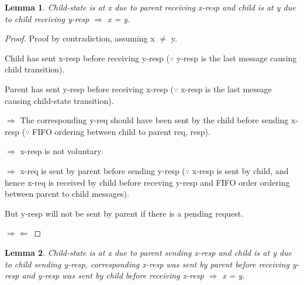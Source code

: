 \documentclass{article}
\newtheorem{lemma}{Lemma}
\begin{document}
\begin{lemma}
Child-state is at x due to parent receiving x-resp and child is at y due to child receiving y-resp $\Rightarrow$ x = y.
\label{CRecvPRecvNetwork}
\end{lemma}

\begin{proof}
Proof by contradiction, assuming x $\neq$ y.

\begin{figure}
\centering
\end{figure}

Child has sent x-resp before receiving y-resp ($\because$ y-resp is the last message causing child transition).

Parent has sent y-resp before receiving x-resp ($\because$ x-resp is the last message causing child-state transition).

$\Rightarrow$ The corresponding y-req should have been sent by the child before sending x-resp ($\because$ FIFO ordering between child to parent req, resp).

$\Rightarrow$ x-resp is not voluntary.

$\Rightarrow$ x-req is sent by parent before sending y-resp ($\because$ x-resp is sent by child, and hence x-req is received by child before receving y-resp and FIFO order ordering between parent to child messages).

But y-resp will not be sent by parent if there is a pending request.

\begin{figure}
\centering
\end{figure}

$\Rightarrow \Leftarrow$
\end{proof}

\begin{lemma}
Child-state is at x due to parent sending x-resp and child is at y due to child sending y-resp, corresponding x-resp was sent by parent before receiving y-resp and y-resp was sent by child before receiving x-resp $\Rightarrow$ x = y.
\label{InsaneNetwork}
\end{lemma}
\end{document}
